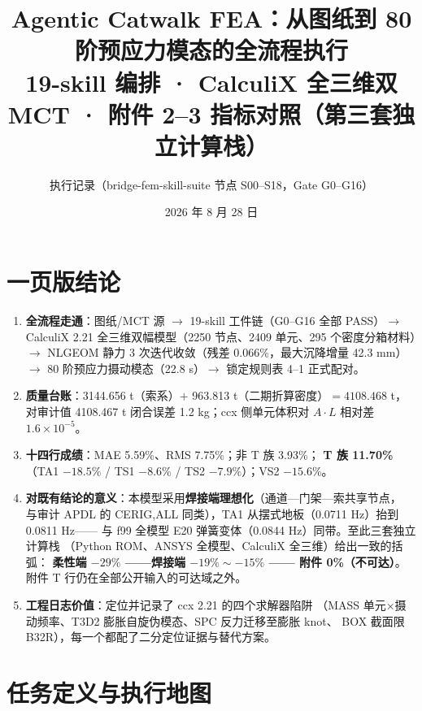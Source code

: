 \documentclass[11pt,a4paper]{ctexart}
\title{\bfseries Agentic Catwalk FEA：从图纸到 80 阶预应力模态的全流程执行\\
\large 19-skill 编排 · CalculiX 全三维双 MCT · 附件 2--3 指标对照（第三套独立计算栈）}
\author{执行记录（bridge-fem-skill-suite 节点 S00--S18，Gate G0--G16）}
\date{2026 年 8 月 28 日}
\begin{document}
\maketitle

\noindent{}

\tableofcontents

\section{一页版结论}

\begin{enumerate}
  \item \textbf{全流程走通}：图纸/MCT 源 $\to$ 19-skill 工件链（G0--G16 全部 PASS）$\to$
        CalculiX 2.21 全三维双幅模型（2250 节点、2409 单元、295 个密度分箱材料）$\to$
        NLGEOM 静力 3 次迭代收敛（残差 0.066\%，最大沉降增量 42.3 mm）$\to$
        80 阶预应力摄动模态（22.8 s）$\to$ 锁定规则表 4--1 正式配对。
  \item \textbf{质量台账}：3144.656 t（索系）$+$ 963.813 t（二期折算密度）$=4108.468$ t，
        对审计值 4108.467 t 闭合误差 1.2 kg；ccx 侧单元体积对 $A\cdot L$ 相对差 $1.6\times10^{-5}$。
  \item \textbf{十四行成绩}：MAE 5.59\%、RMS 7.75\%；非 T 族 3.93\%；
        \textbf{T 族 11.70\%}（TA1 $-18.5\%$ / TS1 $-8.6\%$ / TS2 $-7.9\%$）；VS2 $-15.6\%$。
  \item \textbf{对既有结论的意义}：本模型采用\textbf{焊接端理想化}（通道—门架—索共享节点，
        与审计 APDL 的 CERIG,ALL 同类），TA1 从摆式地板（0.0711 Hz）抬到 0.0811 Hz——
        与 f99 全模型 E20 弹簧变体（0.0844 Hz）同带。至此三套独立计算栈
        （Python ROM、ANSYS 全模型、CalculiX 全三维）给出一致的括弧：
        \textbf{柔性端 $-29\%$ ——焊接端 $-19\%\sim-15\%$ —— 附件 0\%（不可达）}。
        附件 T 行仍在全部公开输入的可达域之外。
  \item \textbf{工程日志价值}：定位并记录了 ccx 2.21 的四个求解器陷阱
        （MASS 单元×摄动频率、T3D2 膨胀自旋伪模态、SPC 反力迁移至膨胀 knot、
        BOX 截面限 B32R），每一个都配了二分定位证据与替代方案。
\end{enumerate}

\section{任务定义与执行地图}
\end{document}
